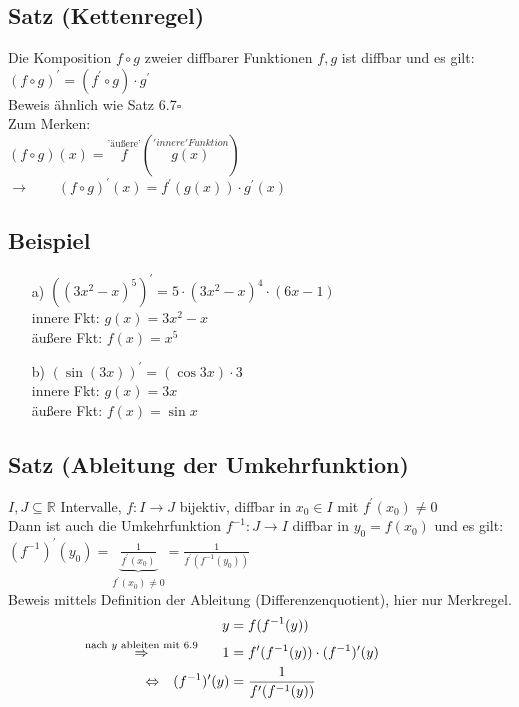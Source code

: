 \documentclass[12pt, titlepage]{article}
\newcommand{\R}{\mathds{R}}
\renewcommand{\>}{\rightarrow}
\renewcommand{\*}{\cdot}
\begin{document}
	\subsection{Satz (Kettenregel)}
	Die Komposition $f\circ g$ zweier diffbarer Funktionen $f,g$ ist diffbar und es gilt:\\
	$(f\circ g)^\prime=(f^\prime\circ g)\*g^\prime$\\
	Beweis ähnlich wie Satz 6.7\hfill$\square$\\
	Zum Merken:\\
	$(f\circ g)(x)=\overset{\textrm{'äußere'}}{f}(\overset{'innere' Funktion}{g(x)})$\\
	$\>\qquad (f\circ g)^\prime(x)=f^\prime(g(x))\*g^\prime(x)$
	\subsection{Beispiel}
	\begin{itemize}
		\item[a)] $((3x^2-x)^5)^\prime=5\*(3x^2-x)^4\*(6x-1)$\\
		innere Fkt: $g(x)=3x^2-x$\\
		äußere Fkt: $f(x)=x^5$
		\item[b)] $(\sin(3x))^\prime=(\cos 3x)\*3$\\
		innere Fkt: $g(x)=3x$\\
		äußere Fkt: $f(x)=\sin x$
	\end{itemize}
	\subsection{Satz (Ableitung der Umkehrfunktion)}
	$I, J\subseteq\R$ Intervalle, $f\colon I\>J$ bijektiv, diffbar in $x_0\in I$ mit $f^\prime(x_0)\neq0$\\
	Dann ist auch die Umkehrfunktion $f^{-1}\colon J\>I$ diffbar in $y_0=f(x_0)$ und es gilt:\\
	$(f^{-1})^\prime(y_0)=\underbrace{\frac{1}{f^\prime(x_0)}}_{f^\prime(x_0)\neq0}=\frac{1}{f^\prime(f^{-1}(y_0))}$\\
	Beweis mittels Definition der Ableitung (Differenzenquotient), hier nur Merkregel.
	\begin{align*}
		&&y&=f(f^{-1}(y))\\
		&\mathclap{\overset{\textrm{nach }y\textrm{ ableiten mit 6.9}}{\Rightarrow}}&1&=f^\prime(f^{-1}(y))\*(f^{-1})^\prime(y)\\
		&\Leftrightarrow&(f^{-1})^\prime(y)&=\frac{1}{f^\prime(f^{-1}(y))}
	\end{align*}
\end{document}
